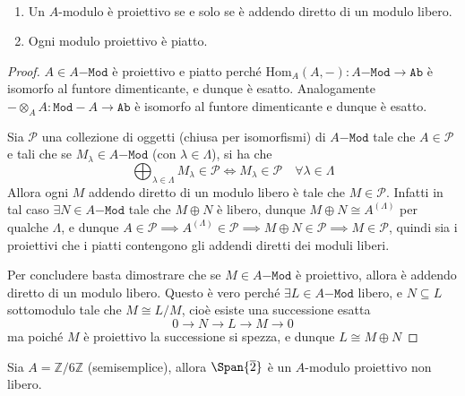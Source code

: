 \begin{corollary}{} \(\) 
\begin{enumerate}[label = \arabic*.]
    \item Un \(A\)-modulo è proiettivo se e solo se è addendo diretto di un
        modulo libero.
    \item Ogni modulo proiettivo è piatto.
\end{enumerate}
\end{corollary}
\begin{proof}{}
    \(A \in A\mathtt{-Mod}\) è proiettivo e piatto perché \(\mathrm{Hom}_A {(A,
    -)} : A\mathtt{-Mod} \to \mathtt{Ab}\) è isomorfo al funtore dimenticante, e
    dunque è esatto. Analogamente \(- \otimes_A A : \mathtt{Mod-}A \to
    \mathtt{Ab}\) è isomorfo al funtore dimenticante e dunque è esatto.

    Sia \(\mathcal{P}\) una collezione di oggetti (chiusa per isomorfismi) di
    \(A\mathtt{-Mod}\) tale che \(A \in \mathcal{P}\) e tali che se \(M_\lambda
    \in A\mathtt{-Mod}\) (con \(\lambda \in \Lambda\)), si ha che 
    \[
      \bigoplus_{\lambda \in \Lambda} M_\lambda \in \mathcal{P} \iff M_\lambda
      \in \mathcal{P} \quad \forall \lambda \in \Lambda
    \]
    Allora ogni \(M\) addendo diretto di un modulo libero è tale che \(M \in
    \mathcal{P}\). Infatti in tal caso \(\exists N \in A\mathtt{-Mod}\) tale che
    \(M \oplus N\) è libero, dunque \(M \oplus N \cong A^{{(\Lambda)}}\) per
    qualche \(\Lambda\), e dunque \(A \in \mathcal{P} \implies A^{{(\Lambda)}}
    \in \mathcal{P} \implies M \oplus N \in \mathcal{P} \implies  M \in
    \mathcal{P}\), quindi sia i proiettivi che i piatti contengono gli addendi
    diretti dei moduli liberi.

    Per concludere basta dimostrare che se \(M \in A\mathtt{-Mod}\) è
    proiettivo, allora è addendo diretto di un modulo libero. Questo è vero
    perché \(\exists L \in A\mathtt{-Mod}\) libero, e \(N \subseteq L \)
    sottomodulo tale che \(M \cong L/M\), cioè esiste una successione esatta
    \[
      0 \to N \to L \to M \to 0
    \]
    ma poiché \(M\) è proiettivo la successione si spezza, e dunque \(L \cong M
    \oplus N\) 
\end{proof}

\begin{example}{}
    Sia \(A = \mathbb{Z} / 6 \mathbb{Z}\) (semisemplice), allora
    \(\Span{\overline{2}} \) è un \(A\)-modulo proiettivo non libero.
\end{example}

